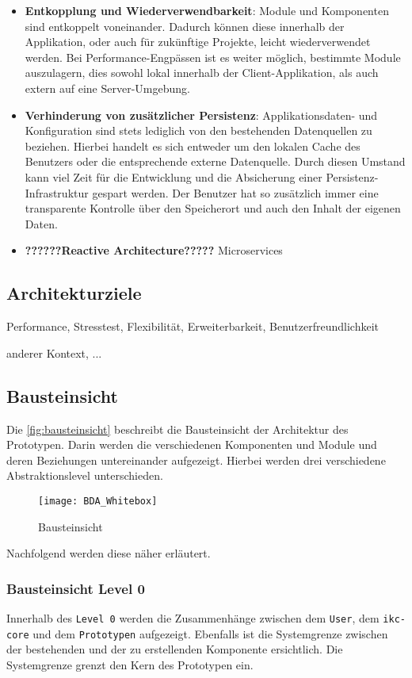 \begin{itemize}
    \item \textbf{Entkopplung und Wiederverwendbarkeit}:
    Module und Komponenten sind entkoppelt voneinander. Dadurch können diese innerhalb der Applikation, oder auch für zukünftige Projekte, leicht wiederverwendet werden. Bei Performance-Engpässen ist es weiter möglich, bestimmte Module auszulagern, dies sowohl lokal innerhalb der Client-Applikation, als auch extern auf eine Server-Umgebung.
    \item \textbf{Verhinderung von zusätzlicher Persistenz}:
    Applikationsdaten- und Konfiguration sind stets lediglich von den bestehenden Datenquellen zu beziehen. Hierbei handelt es sich entweder um den lokalen Cache des Benutzers oder die entsprechende externe Datenquelle. Durch diesen Umstand kann viel Zeit für die Entwicklung und die Absicherung einer Persistenz-Infrastruktur gespart werden. Der Benutzer hat so zusätzlich immer eine transparente Kontrolle über den Speicherort und auch den Inhalt der eigenen Daten.
    \item \textbf{??????Reactive Architecture?????} Microservices
\end{itemize}

\subsection{Architekturziele}
Performance, Stresstest, Flexibilität, Erweiterbarkeit, Benutzerfreundlichkeit

anderer Kontext, ...


\subsection{Bausteinsicht}
Die \autoref{fig:bausteinsicht} beschreibt die Bausteinsicht der Architektur des Prototypen. Darin werden die verschiedenen Komponenten und Module und deren Beziehungen untereinander aufgezeigt. Hierbei werden drei verschiedene Abstraktionslevel unterschieden. 

\begin{figure}[H]
\centering
\texttt{[image: BDA\_Whitebox]}
\caption{Bausteinsicht}
\label{fig:bausteinsicht}
\end{figure}

Nachfolgend werden diese näher erläutert.

\subsubsection{Bausteinsicht Level 0}
Innerhalb des \texttt{Level 0} werden die Zusammenhänge zwischen dem \texttt{User}, dem \texttt{ikc-core} und dem \texttt{Prototypen} aufgezeigt. Ebenfalls ist die Systemgrenze zwischen der bestehenden und der zu erstellenden Komponente ersichtlich. Die Systemgrenze grenzt den Kern des Prototypen ein.

